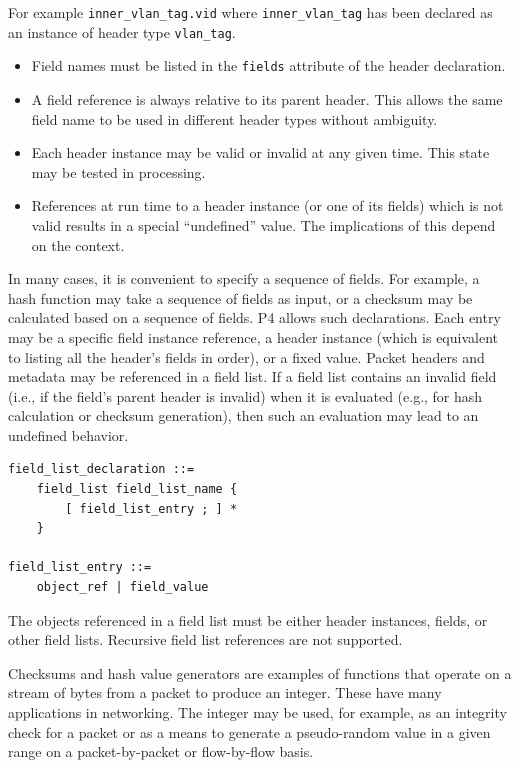 \documentclass[12pt]{article}
\begin{document}
For example \texttt{inner_vlan_tag.vid} where
\texttt{inner_vlan_tag} has been declared as an instance of header
type \texttt{vlan_tag}.

\begin{itemize}
\item
Field names must be listed in the \texttt{fields} attribute of the
header declaration.
\item
A field reference is always relative to its parent header.  This allows the 
same field name to be used in different header types without ambiguity.
\item
Each header instance may be valid or invalid at any given time. This state 
may be tested in \matchaction processing.
\item
References at run time to a header instance (or one of its fields) which is 
not valid results in a special ``undefined'' value.  The implications of this 
depend on the context.
\end{itemize}


In many cases, it is convenient to specify a sequence of fields. For example, 
a hash function may take a sequence of fields as input, or a checksum may be 
calculated based on a sequence of fields. P4 allows such declarations. Each 
entry may be a specific field instance reference, a header instance (which 
is equivalent to listing all the header's fields in order), or a fixed value. 
Packet headers and metadata may be referenced in a field list. If a field list
contains an invalid field (i.e., if the field's parent header is invalid) when
it is evaluated (e.g., for hash calculation or checksum generation),
then such an evaluation may lead to an undefined behavior.

\begin{lstlisting}[style=BNFstyle]
field_list_declaration ::=
    field_list field_list_name {
        [ field_list_entry ; ] *
    }

field_list_entry ::= 
    object_ref | field_value
\end{lstlisting}

The objects referenced in a field list must be either header instances,
fields, or other field lists. Recursive field list references are not
supported.


Checksums and hash value generators are examples of functions that operate on a
stream of bytes from a packet to produce an integer. These have many
applications in networking. The integer may be used, for example, as an
integrity check for a packet or as a means to generate a pseudo-random value in
a given range on a packet-by-packet or flow-by-flow basis.
\end{document}
